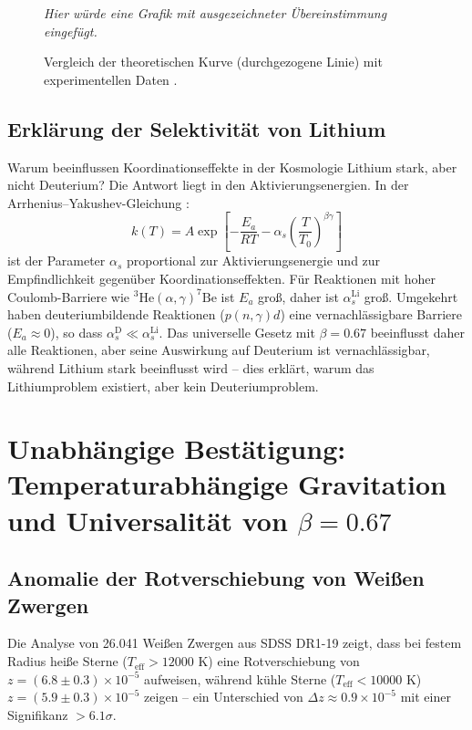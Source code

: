 \documentclass[12pt,a4paper]{article}
\theoremstyle{remark}
\newcommand{\alp}{\alpha}
\begin{document}
	\begin{figure}[h]
		\centering
		\caption{Vergleich der theoretischen Kurve (durchgezogene Linie) mit experimentellen Daten \cite{fortov2001}.}
		\label{fig:fitted}
		\textit{Hier würde eine Grafik mit ausgezeichneter Übereinstimmung eingefügt.}
	\end{figure}
	
	\subsection{Erklärung der Selektivität von Lithium}
	
	Warum beeinflussen Koordinationseffekte in der Kosmologie Lithium stark, aber nicht Deuterium? Die Antwort liegt in den Aktivierungsenergien. In der Arrhenius–Yakushev-Gleichung \cite{appendixC}:
	\begin{equation}
		k(T) = A \exp\left[-\frac{E_a}{RT} - \alp_s \left(\frac{T}{T_0}\right)^{\beta\gamma}\right]
		\label{eq:arrhenius_yak}
	\end{equation}
	ist der Parameter \(\alp_s\) proportional zur Aktivierungsenergie und zur Empfindlichkeit gegenüber Koordinationseffekten. Für Reaktionen mit hoher Coulomb-Barriere wie \(^3\mathrm{He}(\alpha,\gamma)^7\mathrm{Be}\) ist \(E_a\) groß, daher ist \(\alp_s^{\mathrm{Li}}\) groß. Umgekehrt haben deuteriumbildende Reaktionen (\(p(n,\gamma)d\)) eine vernachlässigbare Barriere (\(E_a \approx 0\)), so dass \(\alp_s^{\mathrm{D}} \ll \alp_s^{\mathrm{Li}}\). Das universelle Gesetz mit \(\beta = 0.67\) beeinflusst daher alle Reaktionen, aber seine Auswirkung auf Deuterium ist vernachlässigbar, während Lithium stark beeinflusst wird – dies erklärt, warum das Lithiumproblem existiert, aber kein Deuteriumproblem.
	
	\section{Unabhängige Bestätigung: Temperaturabhängige Gravitation und Universalität von \(\beta = 0.67\)}
	\label{sec:universal-proof}
	
	\subsection{Anomalie der Rotverschiebung von Weißen Zwergen}
	\label{subsec:wd-anomaly}
	
	Die Analyse von 26.041 Weißen Zwergen aus SDSS DR1-19 \cite{Crumpler2024} zeigt, dass bei festem Radius heiße Sterne (\(T_{\mathrm{eff}} > 12000\) K) eine Rotverschiebung von \(z = (6.8 \pm 0.3) \times 10^{-5}\) aufweisen, während kühle Sterne (\(T_{\mathrm{eff}} < 10000\) K) \(z = (5.9 \pm 0.3) \times 10^{-5}\) zeigen – ein Unterschied von \(\Delta z \approx 0.9 \times 10^{-5}\) mit einer Signifikanz \(>6.1\sigma\).
	
\end{document}
